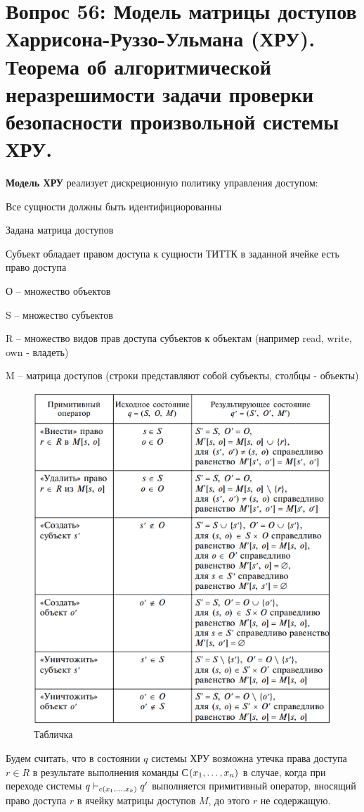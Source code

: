 \section{Вопрос 56: Модель матрицы доступов Харрисона-Руззо-Ульмана (ХРУ). Теорема об алгоритмической неразрешимости задачи проверки безопасности произвольной системы ХРУ.}

\textbf{Модель ХРУ} реализует дискреционную политику управления доступом:
\begin{enumerate*}
	\item Все сущности должны быть идентифициорованны
	\item Задана матрица доступов
	\item Субъект обладает правом доступа к сущности ТИТТК в заданной ячейке есть право доступа
\end{enumerate*}

\begin{defs}
	\begin{enumerate*}
		\item О -- множество объектов
		\item S -- множество субъектов
		\item R -- множество видов прав доступа субъектов к объектам (например read, write, own - владеть)
		\item M -- матрица доступов (строки представляют собой субъекты, столбцы - объекты)
	\end{enumerate*}
\end{defs}

\begin{figure}[H]
	\centering
	\includegraphics[width=0.5\linewidth]{img/1.png}
	\caption{Табличка}
\end{figure}

\begin{defs}
	Будем считать, что в состоянии $q$ системы ХРУ возможна утечка права доступа $r \in R$ в результате выполнения команды С$\left(x_1,\ldots,x_n\right)$ в случае,
	когда при переходе системы $q \vdash_{c(x_1, \ldots, x_k)} q^{\prime}$ выполняется примитивный оператор, вносящий право доступа $r$ в ячейку матрицы доступов $M$, до этого $r$
	не содержащую.
\end{defs}


